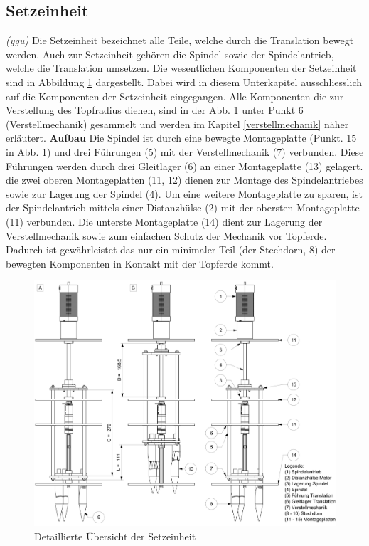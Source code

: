 \subsection{Setzeinheit}
\textit{(ygu)} Die Setzeinheit bezeichnet alle Teile, welche durch die Translation bewegt werden. Auch zur Setzeinheit gehören die Spindel sowie der Spindelantrieb, welche die Translation umsetzen.
\newline
Die wesentlichen Komponenten der Setzeinheit sind in Abbildung \ref{fig:setzeinheit} dargestellt. Dabei wird in diesem Unterkapitel ausschliesslich auf die Komponenten der Setzeinheit eingegangen. Alle Komponenten die zur Verstellung des Topfradius dienen, sind in der Abb.  \ref{fig:setzeinheit} unter Punkt 6 (Verstellmechanik) gesammelt und werden im Kapitel \ref{verstellmechanik} näher erläutert.
\newline
\newline
\textbf{Aufbau}
\newline
Die Spindel ist durch eine bewegte Montageplatte (Punkt. 15 in Abb. \ref{fig:setzeinheit}) und drei Führungen (5) mit der Verstellmechanik (7) verbunden. Diese Führungen werden durch drei Gleitlager (6)  an einer Montageplatte (13) gelagert. die zwei oberen Montageplatten (11, 12) dienen zur Montage des Spindelantriebes sowie zur Lagerung der Spindel (4). Um eine weitere Montageplatte zu sparen, ist der Spindelantrieb mittels einer Distanzhülse (2) mit der obersten Montageplatte (11) verbunden. Die unterste Montageplatte (14) dient zur Lagerung der Verstellmechanik sowie zum einfachen Schutz der Mechanik vor Topferde. Dadurch ist gewährleistet das nur ein minimaler Teil (der Stechdorn, 8) der bewegten Komponenten in Kontakt mit der Topferde kommt.
	\begin{figure}[H]
	\includegraphics[scale=0.53]{Illustrationen/6-Umsetzung/setzeinheit_aio.jpg}
	\caption{Detaillierte Übersicht der Setzeinheit}
	\label{fig:setzeinheit}
\end{figure}

